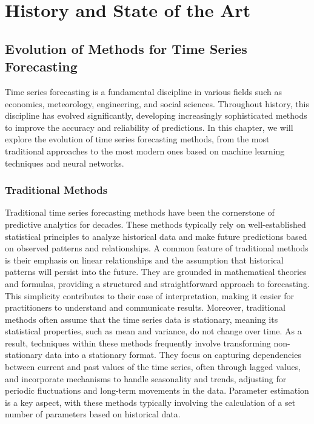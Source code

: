 \chapter{History and State of the Art}
\pagestyle{esitscCD}

\section{Evolution of Methods for Time Series Forecasting}

Time series forecasting is a fundamental discipline in various fields such as economics, meteorology, engineering, and social sciences. Throughout history, this discipline has evolved significantly, developing increasingly sophisticated methods to improve the accuracy and reliability of predictions. In this chapter, we will explore the evolution of time series forecasting methods, from the most traditional approaches to the most modern ones based on machine learning techniques and neural networks.


\subsection{Traditional Methods}

Traditional time series forecasting methods have been the cornerstone of predictive analytics for decades. These methods typically rely on well-established statistical principles to analyze historical data and make future predictions based on observed patterns and relationships. A common feature of traditional methods is their emphasis on linear relationships and the assumption that historical patterns will persist into the future. They are grounded in mathematical theories and formulas, providing a structured and straightforward approach to forecasting. This simplicity contributes to their ease of interpretation, making it easier for practitioners to understand and communicate results.
Moreover, traditional methods often assume that the time series data is stationary, meaning its statistical properties, such as mean and variance, do not change over time. As a result, techniques within these methods frequently involve transforming non-stationary data into a stationary format. They focus on capturing dependencies between current and past values of the time series, often through lagged values, and incorporate mechanisms to handle seasonality and trends, adjusting for periodic fluctuations and long-term movements in the data. Parameter estimation is a key aspect, with these methods typically involving the calculation of a set number of parameters based on historical data.

